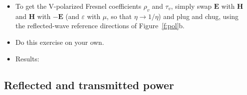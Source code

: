 \documentclass[11pt, oneside]{article}
\begin{document}
\begin{itemize}
	\item To get the V-polarized Fresnel coefficients $\rho_v$ and $\tau_v$, simply swap $\mathbf{E}$ with $\mathbf{H}$ and $\mathbf{H}$ with $-\mathbf{E}$ (and $\varepsilon$ with $\mu$, so that $\eta \rightarrow 1/\eta$) and plug and chug, using the reflected-wave reference directions of Figure~\ref{f:pol}b.
	\item Do this exercise on your own.
	\item Results:
\end{itemize}

\begin{center}
\end{center}

\subsection{Reflected and transmitted power}
\end{document}
